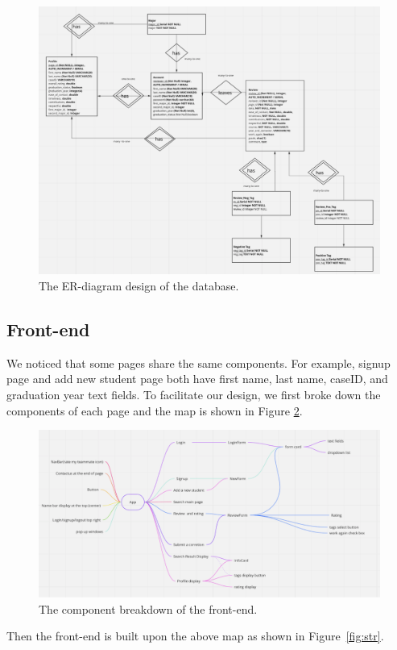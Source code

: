\documentclass[12pt]{article}
\begin{document}
\begin{figure}[htp]
    \centering
    \label{fig:er}
    \includegraphics[scale=0.48]{er.png}
    \caption{The ER-diagram design of the database.}
\end{figure}

\subsection{Front-end}
We noticed that some pages share the same components. For example, signup page and add new student page both have 
first name, last name, caseID, and graduation year text fields.
To facilitate our design, we first broke down the components of each page and 
the map is shown in Figure \ref{fig:frontend}.
\begin{figure}[h]
    \centering
    \label{fig:frontend}
    \includegraphics[scale=0.5]{front-end.png}
    \caption{The component breakdown of the front-end.}
\end{figure}
Then the front-end is built upon the above map as shown in Figure~\ref{fig:str}. 
\end{document}
